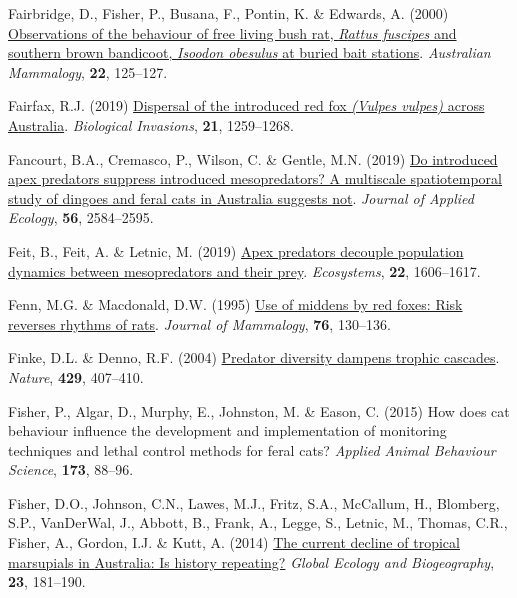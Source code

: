 \documentclass[11pt,a4paper,titlepage,twoside,openright]{style/unimelbthesis}
\newenvironment{CSLReferences}%
  {}%
  {\par}
\begin{document}
\begin{mainmatter}
\begin{CSLReferences}{1}{0}
\leavevmode{}%
Fairbridge, D., Fisher, P., Busana, F., Pontin, K. \& Edwards, A. (2000) \href{https://doi.org/10.1071/AM00125}{Observations of the behaviour of free living bush rat, \emph{{R}attus fuscipes} and southern brown bandicoot, \emph{{I}soodon obesulus} at buried bait stations}. \emph{{A}ustralian Mammalogy}, \textbf{22}, 125--127.

\leavevmode{}%
Fairfax, R.J. (2019) \href{https://doi.org/10.1007/s10530-018-1897-7}{Dispersal of the introduced red fox \emph{({Vulpes vulpes})} across {A}ustralia}. \emph{Biological Invasions}, \textbf{21}, 1259--1268.

\leavevmode{}%
Fancourt, B.A., Cremasco, P., Wilson, C. \& Gentle, M.N. (2019) \href{https://doi.org/10.1111/1365-2664.13514}{Do introduced apex predators suppress introduced mesopredators? A multiscale spatiotemporal study of dingoes and feral cats in {A}ustralia suggests not}. \emph{Journal of Applied Ecology}, \textbf{56}, 2584--2595.

\leavevmode{}%
Feit, B., Feit, A. \& Letnic, M. (2019) \href{https://doi.org/10.1007/s10021-019-00360-2}{Apex predators decouple population dynamics between mesopredators and their prey}. \emph{Ecosystems}, \textbf{22}, 1606--1617.

\leavevmode{}%
Fenn, M.G. \& Macdonald, D.W. (1995) \href{https://doi.org/10.2307/1382321}{Use of middens by red foxes: Risk reverses rhythms of rats}. \emph{Journal of Mammalogy}, \textbf{76}, 130--136.

\leavevmode{}%
Finke, D.L. \& Denno, R.F. (2004) \href{https://doi.org/10.1038/nature02554}{Predator diversity dampens trophic cascades}. \emph{Nature}, \textbf{429}, 407--410.

\leavevmode{}%
Fisher, P., Algar, D., Murphy, E., Johnston, M. \& Eason, C. (2015) How does cat behaviour influence the development and implementation of monitoring techniques and lethal control methods for feral cats? \emph{Applied Animal Behaviour Science}, \textbf{173}, 88--96.

\leavevmode{}%
Fisher, D.O., Johnson, C.N., Lawes, M.J., Fritz, S.A., McCallum, H., Blomberg, S.P., VanDerWal, J., Abbott, B., Frank, A., Legge, S., Letnic, M., Thomas, C.R., Fisher, A., Gordon, I.J. \& Kutt, A. (2014) \href{https://doi.org/10.1111/geb.12088}{The current decline of tropical marsupials in {{A}ustralia}: Is history repeating?} \emph{Global Ecology and Biogeography}, \textbf{23}, 181--190.


\end{CSLReferences}
\end{mainmatter}
\end{document}
